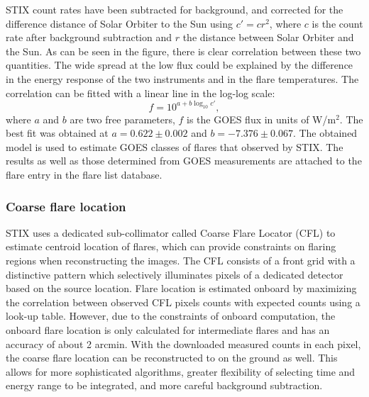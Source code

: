 \documentclass[referee]{aa} %
\begin{document}
STIX count rates  have been subtracted for background,  and corrected for 
the difference distance of Solar Orbiter to the Sun using $c'=c r^2$, where $c$ is the count rate after background subtraction
 and $r$ the distance between Solar Orbiter and the Sun. 
As can be seen in the figure, there is clear correlation between
these two quantities.  The wide spread at the low flux could be explained by the difference in 
the energy response of the two instruments and in the flare temperatures.
The correlation can be fitted with a linear line in the log-log scale: 
\begin{equation}
f=10^{a+b\log_{10} c'}, 
\label{eq:goes-stix}
\end{equation}
where $a$ and $b$ are two free parameters, $f$ is the GOES flux  in units of W/m$^2$.
 The best fit was obtained at $a=0.622\pm 0.002$ and $b=-7.376\pm0.067$.
The obtained model is used to estimate  GOES classes 
 of flares that observed by STIX. 
The results as well as those determined from GOES measurements
are attached to  the flare entry in the flare list database. 
\subsubsection{Coarse flare location}
STIX uses a dedicated sub-collimator called Coarse Flare Locator (CFL) to estimate 
centroid location of flares, which can provide constraints on flaring regions when reconstructing the images. 
The CFL consists of a front grid with
a distinctive pattern which selectively illuminates pixels of a 
dedicated detector based on the source location.
Flare location is estimated onboard by maximizing the correlation between observed CFL pixels counts 
with expected counts using a look-up table. 
However, due to the constraints of onboard computation, the onboard flare location is  only calculated for intermediate flares 
and has an accuracy of about 2 arcmin. 
With the downloaded measured counts  in each pixel,
the coarse flare location can be reconstructed to on the ground as well. 
This allows for more sophisticated algorithms, greater flexibility of selecting time and energy 
range to be integrated, and more careful background subtraction.
\end{document}
